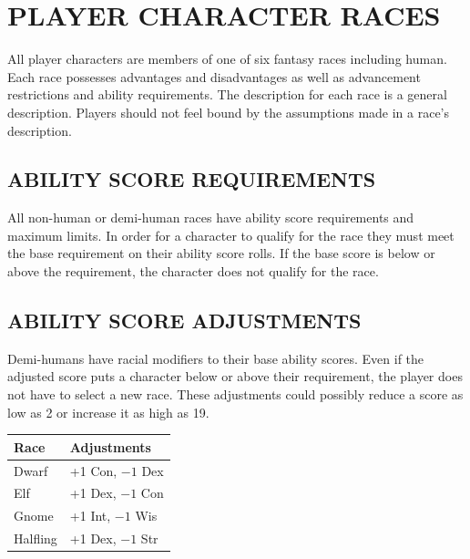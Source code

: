 \chapter{PLAYER CHARACTER RACES}

\begin{multicols}{2}

All player characters are members of one of six fantasy races including human.  Each race possesses advantages and disadvantages as well as advancement restrictions and ability requirements.  The description for each race is a general description.  Players should not feel bound by the assumptions made in a race's description.

\section{ABILITY SCORE REQUIREMENTS}

All non-human or demi-human races have ability score requirements and maximum limits.  In order for a character to qualify for the race they must meet the base requirement on their ability score rolls.  If the base score is below or above the requirement, the character does not qualify for the race.

\section{ABILITY SCORE ADJUSTMENTS}

Demi-humans have racial modifiers to their base ability scores.  Even if the adjusted score puts a character below or above their requirement, the player does not have to select a new race.  These adjustments could possibly reduce a score as low as 2 or increase it as high as 19.

\noindent
\begin{minipage}{\columnwidth}

\label{scoreadjustments}
\noindent
\begin{tabular}{|m{}|m{}|}
\hline
Race			& Adjustments \\
\hline\hline
\rowcolor[gray]{.9}Dwarf		& +1 Con, $-1$ Dex \\
Elf			& +1 Dex, $-1$ Con \\
\rowcolor[gray]{.9}Gnome		& +1 Int, $-1$ Wis \\
Halfling	& +1 Dex, $-1$ Str \\
\hline
\end{tabular}


\end{minipage}
\end{multicols}
